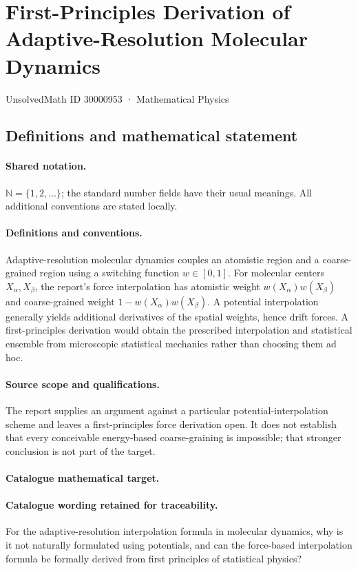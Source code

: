 \documentclass[11pt]{article}
\begin{document}
\setcounter{section}{30000952}
\section{First-Principles Derivation of Adaptive-Resolution Molecular Dynamics}\label{30000953}
{\small UnsolvedMath ID 30000953 · Mathematical Physics}
\subsection{Definitions and mathematical statement}

\paragraph{Shared notation.}$\mathbb N=\{1,2,\ldots\}$; the standard number fields have their usual meanings. All additional conventions are stated locally.


\paragraph{Definitions and conventions.} Adaptive-resolution molecular dynamics couples an atomistic region and a coarse-grained region using a switching function $w\in[0,1]$. For molecular centers $X_\alpha,X_\beta$, the report's force interpolation has atomistic weight $w(X_\alpha)w(X_\beta)$ and coarse-grained weight $1-w(X_\alpha)w(X_\beta)$. A potential interpolation generally yields additional derivatives of the spatial weights, hence drift forces. A first-principles derivation would obtain the prescribed interpolation and statistical ensemble from microscopic statistical mechanics rather than choosing them ad hoc.

\paragraph{Source scope and qualifications.} The report supplies an argument against a particular potential-interpolation scheme and leaves a first-principles force derivation open. It does not establish that every conceivable energy-based coarse-graining is impossible; that stronger conclusion is not part of the target.

\paragraph{Catalogue mathematical target.}
\paragraph{Catalogue wording retained for traceability.}
For the adaptive-resolution interpolation formula in molecular dynamics, why is it not naturally formulated using potentials, and can the force-based interpolation formula be formally derived from first principles of statistical physics?
\end{document}
